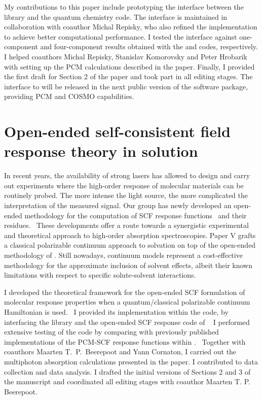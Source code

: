 My contributions to this paper include prototyping the interface between the
\pcmsolver library and the \ReSpect quantum chemistry code.
The interface is maintained in collaboration with coauthor Michal Repisky, who also
refined the implementation to achieve better computational performance.
I tested the interface against one-component and four-component results obtained with
the \LSDALTON and \DIRAC codes, respectively.
I helped coauthors Michal Repisky, Stanislav Komorovsky and Peter Hrobarik
with setting up the \acs{PCM} calculations described in the paper.
Finally, I provided the first draft for Section 2 of the paper and took part in all editing stages.
The interface to \ReSpect will be released in the next public version of the software
package, providing \acs{PCM} and \acs{COSMO} capabilities.

\section{Open-ended self-consistent field response theory in
solution}\label{sec:pcmopenrsp}

In recent years, the availability of strong lasers has allowed to
design and carry out experiments where the high-order response of
molecular materials can be routinely probed.
The more intense the light source, the more complicated the interpretation of
the measured signal.
Our group has newly developed an open-ended methodology for the computation of
\acs{SCF} response functions~\autocite{Thorvaldsen2008-sg, Ringholm2014-gx} and
their residues.~\autocite{Friese2015-kb}
These developments offer a route towards a synergistic experimental and
theoretical approach to high-order absorption spectroscopies.
Paper V grafts a classical polarizable continuum approach to solvation on top
of the open-ended methodology of \citeauthor{Thorvaldsen2008-sg}.
Still nowadays, continuum models represent a cost-effective methodology for the
approximate inclusion of solvent effects, albeit their known limitations with respect
to specific solute-solvent interactions.

I developed the theoretical framework for the open-ended \acs{SCF} formulation
of molecular response properties when a quantum/classical polarizable continuum
Hamiltonian is used.~\autocite{Thorvaldsen2008-sg, Lipparini2010-be}
I provided its implementation within the \DALTON code, by interfacing the
\pcmsolver library and the open-ended \acs{SCF} response code of
\citeauthor{Ringholm2014-gx}~\autocite{Ringholm2014-gx, Friese2015-kb}
I performed extensive testing of the code by comparing with previously
published implementations of the \acs{PCM}-\acs{SCF} response functions within
\DALTON.~\autocite{Cammi2003-qy, Frediani2005-nc, Ferrighi2010-pm}
Together with coauthors Maarten T.~P.~Beerepoot and Yann Cornaton, I carried out
the multiphoton absorption calculations presented in the paper. I contributed
to data collection and data analysis.
I drafted the initial versions of Sections 2 and 3 of the manuscript and coordinated all
editing stages with coauthor Maarten T. P. Beerepoot.
